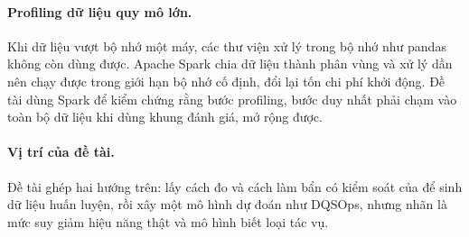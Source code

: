 \paragraph{Profiling dữ liệu quy mô lớn.} Khi dữ liệu vượt bộ nhớ một máy, các thư viện xử lý trong bộ nhớ như pandas \citep{mckinney2010pandas} không còn dùng được. Apache Spark \citep{zaharia2016spark} chia dữ liệu thành phân vùng và xử lý dần nên chạy được trong giới hạn bộ nhớ cố định, đổi lại tốn chi phí khởi động. Đề tài dùng Spark để kiểm chứng rằng bước profiling, bước duy nhất phải chạm vào toàn bộ dữ liệu khi dùng khung đánh giá, mở rộng được.

\paragraph{Vị trí của đề tài.} Đề tài ghép hai hướng trên: lấy cách đo và cách làm bẩn có kiểm soát của \bbMohRef{} để sinh dữ liệu huấn luyện, rồi xây một mô hình dự đoán như DQSOps, nhưng nhãn là mức suy giảm hiệu năng thật và mô hình biết loại tác vụ.
